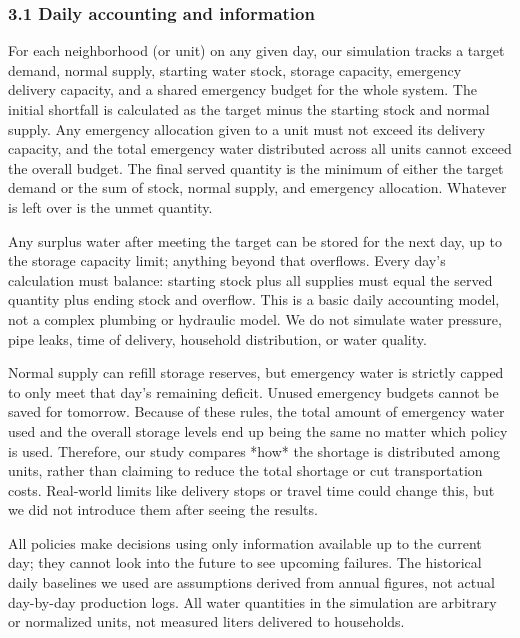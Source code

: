 \documentclass[conference]{IEEEtran}
\begin{document}
\subsubsection{3.1 Daily accounting and information}
For each neighborhood (or unit) on any given day, our simulation tracks a target demand, normal supply, starting water stock, storage capacity, emergency delivery capacity, and a shared emergency budget for the whole system. The initial shortfall is calculated as the target minus the starting stock and normal supply. Any emergency allocation given to a unit must not exceed its delivery capacity, and the total emergency water distributed across all units cannot exceed the overall budget. The final served quantity is the minimum of either the target demand or the sum of stock, normal supply, and emergency allocation. Whatever is left over is the unmet quantity.

Any surplus water after meeting the target can be stored for the next day, up to the storage capacity limit; anything beyond that overflows. Every day's calculation must balance: starting stock plus all supplies must equal the served quantity plus ending stock and overflow. This is a basic daily accounting model, not a complex plumbing or hydraulic model. We do not simulate water pressure, pipe leaks, time of delivery, household distribution, or water quality.

Normal supply can refill storage reserves, but emergency water is strictly capped to only meet that day's remaining deficit. Unused emergency budgets cannot be saved for tomorrow. Because of these rules, the total amount of emergency water used and the overall storage levels end up being the same no matter which policy is used. Therefore, our study compares *how* the shortage is distributed among units, rather than claiming to reduce the total shortage or cut transportation costs. Real-world limits like delivery stops or travel time could change this, but we did not introduce them after seeing the results.

All policies make decisions using only information available up to the current day; they cannot look into the future to see upcoming failures. The historical daily baselines we used are assumptions derived from annual figures, not actual day-by-day production logs. All water quantities in the simulation are arbitrary or normalized units, not measured liters delivered to households.
\end{document}
